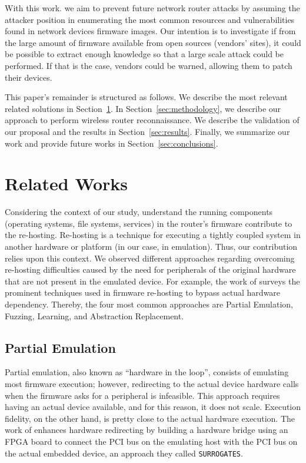 \documentclass[12pt]{article}
\begin{document}
With this work. we aim to prevent future network router attacks by assuming the attacker position in enumerating the most common resources and vulnerabilities found in network devices firmware images. Our intention is to investigate if from the large amount of firmware available from open sources (vendors' sites), it could be possible to extract enough knowledge so that a large scale attack could be performed. If that is the case, vendors could be warned, allowing them to patch their devices.

This paper's remainder is structured as follows. We describe the most relevant related solutions in Section~\ref{sec:related}.  In Section~\ref{sec:methodology}, we describe our approach to perform wireless router reconnaissance. We describe the validation of our proposal and the results in Section~\ref{sec:results}. Finally, we summarize our work and provide future works in Section~\ref{sec:conclusions}.


\section{Related Works}
\label{sec:related}

Considering the context of our study, understand the running components (operating systems, file systems, services) in the router's firmware contribute to the re-hosting.  Re-hosting is a technique for executing a tightly coupled system in another hardware or platform (in our case, in emulation).  Thus, our contribution relies upon this context.  We observed different approaches regarding overcoming re-hosting difficulties caused by the need for peripherals of the original hardware that are not present in the emulated device. For example, the work of \cite{firmware-challenges} surveys the prominent techniques used in firmware re-hosting to bypass actual hardware dependency. Thereby, the four most common approaches are Partial Emulation, Fuzzing, Learning, and Abstraction Replacement.

\subsection{Partial Emulation}

Partial emulation, also known as ``hardware in the loop'', consists of emulating most firmware execution; however, redirecting to the actual device hardware calls when the firmware asks for a peripheral is infeasible. This approach requires having an actual device available, and for this reason, it does not scale. Execution fidelity, on the other hand, is pretty close to the actual hardware execution. The work of \cite{surrogates} enhances hardware redirecting by building a hardware bridge using an FPGA board to connect the PCI bus on the emulating host with the PCI bus on the actual embedded device, an approach they called {\tt SURROGATES}.
\end{document}
